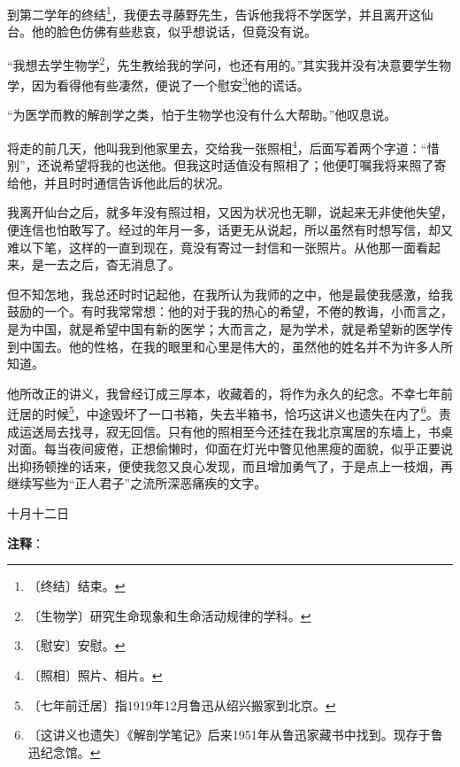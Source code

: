 \documentclass[12pt,UTF-8,openany]{ctexbook}
\begin{document}
\begin{large}
    到第二学年的终结\footnote{〔终结〕结束。}，我便去寻藤野先生，告诉他我将不学医学，并且离开这仙台。他的脸色仿佛有些悲哀，似乎想说话，但竟没有说。
    
    “我想去学生物学\footnote{〔生物学〕研究生命现象和生命活动规律的学科。}，先生教给我的学问，也还有用的。”其实我并没有决意要学生物学，因为看得他有些凄然，便说了一个慰安\footnote{〔慰安〕安慰。}他的谎话。
    
    “为医学而教的解剖学之类，怕于生物学也没有什么大帮助。”他叹息说。
    
    将走的前几天，他叫我到他家里去，交给我一张照相\footnote{〔照相〕照片、相片。}，后面写着两个字道：“惜别”，还说希望将我的也送他。但我这时适值没有照相了；他便叮嘱我将来照了寄给他，并且时时通信告诉他此后的状况。
    
    我离开仙台之后，就多年没有照过相，又因为状况也无聊，说起来无非使他失望，便连信也怕敢写了。经过的年月一多，话更无从说起，所以虽然有时想写信，却又难以下笔，这样的一直到现在，竟没有寄过一封信和一张照片。从他那一面看起来，是一去之后，杳无消息了。
    
    但不知怎地，我总还时时记起他，在我所认为我师的之中，他是最使我感激，给我鼓励的一个。有时我常常想：他的对于我的热心的希望，不倦的教诲，小而言之，是为中国，就是希望中国有新的医学；大而言之，是为学术，就是希望新的医学传到中国去。他的性格，在我的眼里和心里是伟大的，虽然他的姓名并不为许多人所知道。
    
    他所改正的讲义，我曾经订成三厚本，收藏着的，将作为永久的纪念。不幸七年前迁居的时候\footnote{〔七年前迁居〕指1919年12月鲁迅从绍兴搬家到北京。}，中途毁坏了一口书箱，失去半箱书，恰巧这讲义也遗失在内了\footnote{〔这讲义也遗失〕《解剖学笔记》后来1951年从鲁迅家藏书中找到。现存于鲁迅纪念馆。}。责成运送局去找寻，寂无回信。只有他的照相至今还挂在我北京寓居的东墙上，书桌对面。每当夜间疲倦，正想偷懒时，仰面在灯光中瞥见他黑瘦的面貌，似乎正要说出抑扬顿挫的话来，便使我忽又良心发现，而且增加勇气了，于是点上一枝烟，再继续写些为“正人君子”之流所深恶痛疾的文字。
    
    \hfill 十月十二日
    
\end{large}


\newpage

\textbf{注释}：

\vspace{-1em}
\end{document}
